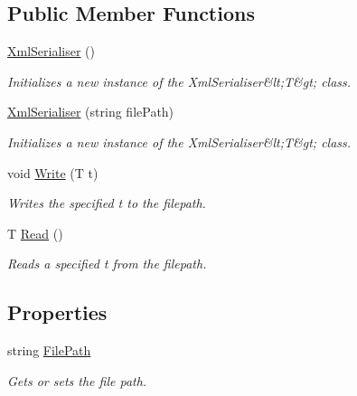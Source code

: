 \subsection*{Public Member Functions}
\begin{DoxyCompactItemize}
\item 
\hyperlink{class_assessment___two___logic_1_1_model_1_1_xml_serialiser-g_a2c48281115bb2ffed3e2d32ed9504e78}{XmlSerialiser} ()
\begin{DoxyCompactList}\small\item\em Initializes a new instance of the XmlSerialiser\&lt;T\&gt; class. \item\end{DoxyCompactList}\item 
\hyperlink{class_assessment___two___logic_1_1_model_1_1_xml_serialiser-g_a2904f550332ba24c01541bb545a31c60}{XmlSerialiser} (string filePath)
\begin{DoxyCompactList}\small\item\em Initializes a new instance of the XmlSerialiser\&lt;T\&gt; class. \item\end{DoxyCompactList}\item 
void \hyperlink{class_assessment___two___logic_1_1_model_1_1_xml_serialiser-g_a4c6ddc315443c363aa3589f136f683d6}{Write} (T t)
\begin{DoxyCompactList}\small\item\em Writes the specified t to the filepath. \item\end{DoxyCompactList}\item 
T \hyperlink{class_assessment___two___logic_1_1_model_1_1_xml_serialiser-g_acbf80fc2e4580b29fdd1dfe68455ae8f}{Read} ()
\begin{DoxyCompactList}\small\item\em Reads a specified t from the filepath. \item\end{DoxyCompactList}\end{DoxyCompactItemize}
\subsection*{Properties}
\begin{DoxyCompactItemize}
\item 
string \hyperlink{class_assessment___two___logic_1_1_model_1_1_xml_serialiser-g_a61f9ebf94a2429d72a4b4bfff95080ce}{FilePath}
\begin{DoxyCompactList}\small\item\em Gets or sets the file path. \item\end{DoxyCompactList}\end{DoxyCompactItemize}


